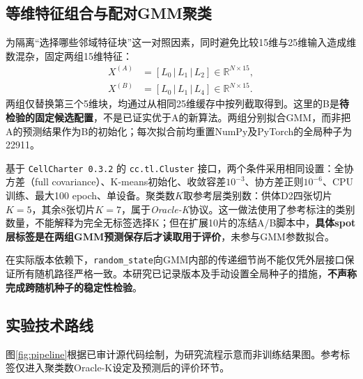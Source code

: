 \documentclass[UTF8,a4paper,12pt]{ctexart}
\begin{document}
\subsection{等维特征组合与配对GMM聚类}
\label{subsec:ab}
为隔离“选择哪些邻域特征块”这一对照因素，同时避免比较15维与25维输入造成维数混杂，固定两组15维特征：
\begin{align}
  X^{(A)} &= [L_0\,|\,L_1\,|\,L_2]\in\mathbb{R}^{N\times15},\\
  X^{(B)} &= [L_0\,|\,L_1\,|\,L_4]\in\mathbb{R}^{N\times15}.
\end{align}
两组仅替换第三个5维块，均通过从相同25维缓存中按列截取得到。这里的B是\textbf{待检验的固定候选配置}，不是已证实优于A的新算法。两组分别拟合GMM，而非把A的预测结果作为B的初始化；每次拟合前均重置NumPy及PyTorch的全局种子为22911。

基于 \texttt{CellCharter~0.3.2} 的 \texttt{cc.tl.Cluster} 接口，两个条件采用相同设置：全协方差（full covariance）、K-means初始化、收敛容差$10^{-3}$、协方差正则$10^{-6}$、CPU训练、最大100 epoch、单设备。聚类数$K$取参考层类别数：供体D2四张切片$K=5$，其余8张切片$K=7$，属于\textit{Oracle-K}协议。这一做法使用了参考标注的类别数量，不能解释为完全无标签选择K；但在扩展10片的冻结A/B脚本中，\textbf{具体spot层标签是在两组GMM预测保存后才读取用于评价}，未参与GMM参数拟合。

在实际版本依赖下，\texttt{random\_state}向GMM内部的传递细节尚不能仅凭外层接口保证所有随机路径严格一致。本研究已记录版本及手动设置全局种子的措施，\textbf{不声称完成跨随机种子的稳定性检验}。

\subsection{实验技术路线}
图\ref{fig:pipeline}根据已审计源代码绘制，为研究流程示意而非训练结果图。参考标签仅进入聚类数Oracle-K设定及预测后的评价环节。
\end{document}
